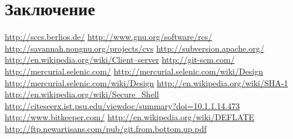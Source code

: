 \documentclass[a4paper]{article}
\begin{document}
\section{Заключение}

\newpage

\begin{thebibliography}{99}
   \url{http://sccs.berlios.de/}
   \url{http://www.gnu.org/software/rcs/}
   \url{http://savannah.nongnu.org/projects/cvs}
   \url{http://subversion.apache.org/}
   \url{http://en.wikipedia.org/wiki/Client–server}
   \url{http://git-scm.com/}
   \url{http://mercurial.selenic.com/}
   \url{http://mercurial.selenic.com/wiki/Design}
   \url{http://mercurial.selenic.com/wiki/Design}
   \url{http://en.wikipedia.org/wiki/SHA-1}
   \url{http://en.wikipedia.org/wiki/Secure\_Shell}
   \url{http://citeseerx.ist.psu.edu/viewdoc/summary?doi=10.1.1.14.473}
   \url{http://www.bitkeeper.com/}
   \url{http://en.wikipedia.org/wiki/DEFLATE}
   \url{http://ftp.newartisans.com/pub/git.from.bottom.up.pdf}
\end{thebibliography}
\end{document}
